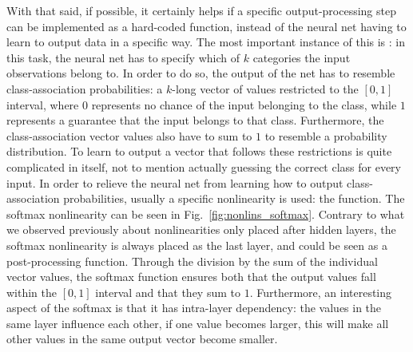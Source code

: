 			With that said, if possible, it certainly helps if a specific output-processing step can be implemented as a hard-coded function, instead of the neural net having to learn to output data in a specific way.
			The most important instance of this is : in this task, the neural net has to specify which of $k$ categories the input observations belong to.
			In order to do so, the output of the net has to resemble class-association probabilities: a $k$-long vector of values restricted to the $[0, 1]$ interval, where $0$ represents no chance of the input belonging to the class, while $1$ represents a guarantee that the input belongs to that class.
			Furthermore, the class-association vector values also have to sum to $1$ to resemble a probability distribution.
			To learn to output a vector that follows these restrictions is quite complicated in itself, not to mention actually guessing the correct class for every input.	
			In order to relieve the neural net from learning how to output class-association probabilities, usually a specific nonlinearity is used: the  function.
			The softmax nonlinearity can be seen in Fig.~\ref{fig:nonlins_softmax}.
			Contrary to what we observed previously about nonlinearities only placed after hidden layers, the softmax nonlinearity is always placed as the last layer, and could be seen as a post-processing function.
			Through the division by the sum of the individual vector values, the softmax function ensures both that the output values fall within the $[0, 1]$ interval and that they sum to $1$.
			Furthermore, an interesting aspect of the softmax is that it has intra-layer dependency: the values in the same layer influence each other, if one value becomes larger, this will make all other values in the same output vector become smaller.
			
